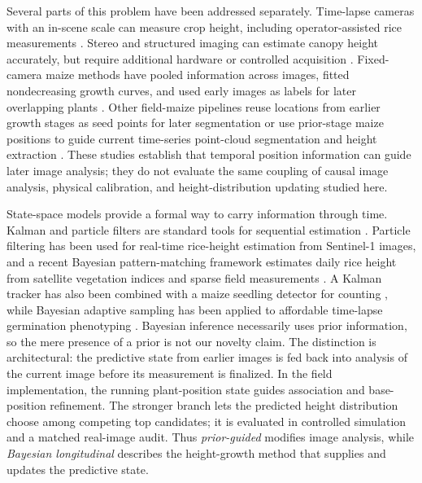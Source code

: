 \documentclass[12pt,letterpaper]{article}
\let\cite\parencite
\begin{document}
Several parts of this problem have been addressed separately. Time-lapse cameras with an in-scene scale can measure crop height, including operator-assisted rice measurements \cite{mano2017precise,manoigawa2017nondestructive}. Stereo and structured imaging can estimate canopy height accurately, but require additional hardware or controlled acquisition \cite{cai2018stereo,tabb2019cass}. Fixed-camera maize methods have pooled information across images, fitted nondecreasing growth curves, and used early images as labels for later overlapping plants \cite{guo2021kat4ia,guo2023sscnn}. Other field-maize pipelines reuse locations from earlier growth stages as seed points for later segmentation or use prior-stage maize positions to guide current time-series point-cloud segmentation and height extraction \cite{gao2022individual,li2023multisource}. These studies establish that temporal position information can guide later image analysis; they do not evaluate the same coupling of causal image analysis, physical calibration, and height-distribution updating studied here.

State-space models provide a formal way to carry information through time. Kalman and particle filters are standard tools for sequential estimation \cite{west1997bayesian,durbin2012time,gordon1993particle}. Particle filtering has been used for real-time rice-height estimation from Sentinel-1 images, and a recent Bayesian pattern-matching framework estimates daily rice height from satellite vegetation indices and sparse field measurements \cite{yang2022ricepf,shimda2026bayesianheight}. A Kalman tracker has also been combined with a maize seedling detector for counting \cite{li2022kalman}, while Bayesian adaptive sampling has been applied to affordable time-lapse germination phenotyping \cite{mercier2025bayesian}. Bayesian inference necessarily uses prior information, so the mere presence of a prior is not our novelty claim. The distinction is architectural: the predictive state from earlier images is fed back into analysis of the current image before its measurement is finalized. In the field implementation, the running plant-position state guides association and base-position refinement. The stronger branch lets the predicted height distribution choose among competing top candidates; it is evaluated in controlled simulation and a matched real-image audit. Thus \emph{prior-guided} modifies image analysis, while \emph{Bayesian longitudinal} describes the height-growth method that supplies and updates the predictive state.
\end{document}
